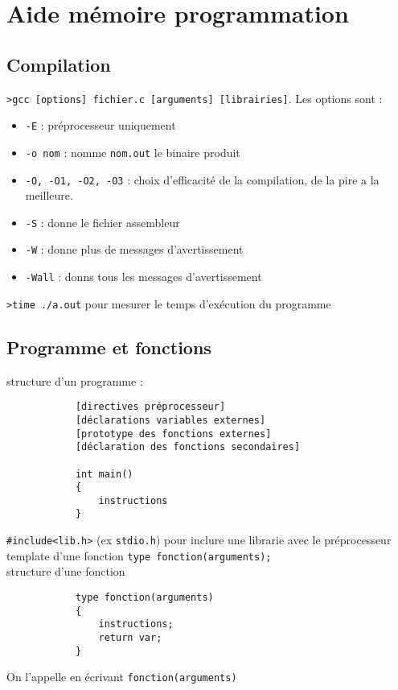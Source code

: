 \chapter*{Aide mémoire programmation}
    \section*{Compilation}
        \texttt{>gcc [options] fichier.c [arguments] [librairies]}. Les options sont :
        \begin{itemize}
            \item \texttt{-E} : préprocesseur uniquement
            \item \texttt{-o nom} : nomme \texttt{nom.out} le binaire produit
            \item \texttt{-O, -O1, -O2, -O3} : choix d'efficacité de la compilation, de la pire a la meilleure.
            \item \texttt{-S} : donne le fichier assembleur
            \item \texttt{-W} : donne plus de messages d'avertissement
            \item \texttt{-Wall} : donns tous les messages d'avertissement
        \end{itemize}
        \texttt{>time ./a.out} pour mesurer le temps d'exécution du programme

    \section*{Programme et fonctions}
        structure d'un programme :
        \begin{verbatim}
            [directives préprocesseur]
            [déclarations variables externes]
            [prototype des fonctions externes]
            [déclaration des fonctions secondaires]

            int main()
            {
                instructions
            }
        \end{verbatim}
        \texttt{#include<lib.h>} (ex \texttt{stdio.h}) pour inclure une librarie avec le préprocesseur \\
        template d'une fonction \texttt{type fonction(arguments);} \\
        structure d'une fonction
        \begin{verbatim}
            type fonction(arguments)
            {
                instructions;
                return var;
            }
        \end{verbatim}
        On l'appelle en écrivant \texttt{fonction(arguments)}

